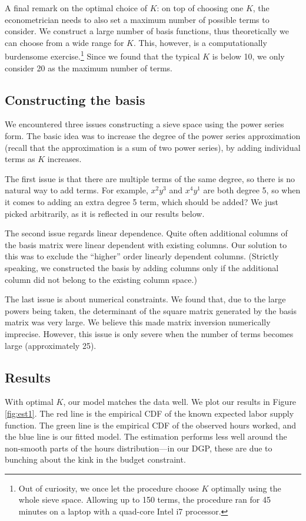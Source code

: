 \documentclass[11pt,letterpaper]{article}                  %
\begin{document}
A final remark on the optimal choice of $K$: on top of choosing one $K$, the econometrician needs to also set a maximum number of possible terms to consider.
We construct a large number of basis functions, thus theoretically we can choose from a wide range for $K$.
This, however, is a computationally burdensome exercise.\footnote{Out of curiosity, we once let the procedure choose $K$ optimally using the whole sieve space. Allowing up to 150 terms, the procedure ran for 45 minutes on a laptop with a quad-core Intel i7 processor.}
Since we found that the typical $K$ is below 10, we only consider 20 as the maximum number of terms.


\subsection{Constructing the basis}

We encountered three issues constructing a sieve space using the power series form.
The basic idea was to increase the degree of the power series approximation (recall that the approximation is a sum of two power series), by adding individual terms as $K$ increases.

The first issue is that there are multiple terms of the same degree, so there is no natural way to add terms.
For example, $x^2y^3$ and $x^4y^1$ are both degree 5, so when it comes to adding an extra degree 5 term, which should be added?
We just picked arbitrarily, as it is reflected in our results below.

The second issue regards linear dependence.
Quite often additional columns of the basis matrix were linear dependent with existing columns.
Our solution to this was to exclude the ``higher'' order linearly dependent columns.
(Strictly speaking, we constructed the basis by adding columns only if the additional column did not belong to the existing column space.)

The last issue is about numerical constraints.
We found that, due to the large powers being taken, the determinant of the square matrix generated by the basis matrix was very large.
We believe this made matrix inversion numerically imprecise.
However, this issue is only severe when the number of terms becomes large (approximately 25).


\subsection{Results}
\label{sec:ex1}

With optimal $K$, our model matches the data well.
We plot our results in Figure \ref{fig:est1}.
The red line is the empirical CDF of the known expected labor supply function. The green
line is the empirical CDF of the observed hours worked, and the blue line is our fitted model.
The estimation performs less well
around the non-smooth parts of the hours distribution---in our DGP,
these are due to bunching about the kink in the budget constraint.
\end{document}
